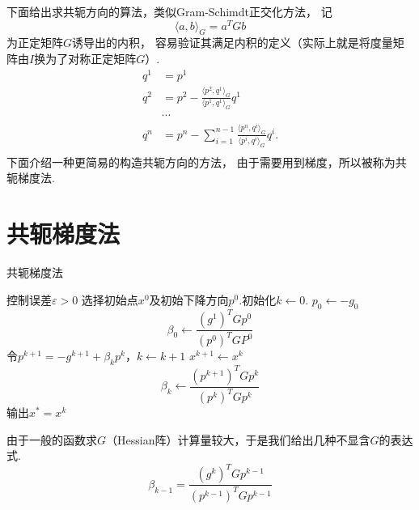 下面给出求共轭方向的算法，类似Gram-Schimdt正交化方法， 记
\begin{equation*}
	\langle a, b\rangle_G = a^T G b
\end{equation*}
为正定矩阵$G$诱导出的内积， 容易验证其满足内积的定义（实际上就是将度量矩阵由$I$换为了对称正定矩阵$G$）.
\begin{equation*}
	\begin{split}
		q^1 &= p^1\\
		q^2 &= p^2 - \frac{\langle p^2, q^1\rangle_G}{\langle p^1, q^1\rangle_G}q^1\\
		& \cdots \\
		q^n &= p^n -\sum \limits_{i=1}^{n-1}\frac{\langle p^n, q^i\rangle_G}{\langle p^i, q^i\rangle_G} q^i.\\
	\end{split}
\end{equation*}
下面介绍一种更简易的构造共轭方向的方法， 由于需要用到梯度，所以被称为共轭梯度法.
\section{共轭梯度法}
\begin{algorithm}[H]
\caption{共轭梯度法}%
\begin{algorithmic}[1]%
\Require 控制误差$\varepsilon > 0$
\State 选择初始点$x^0$及初始下降方向$p^0$.初始化$k \leftarrow 0$.
\State $p_0 \leftarrow -g_0$
\State 
\begin{equation*}
	\beta_0\leftarrow \frac{(g^1)^TGp^0}{(p^0)^TGP^0}
\end{equation*}
\State 令$p^{k+1} = -g^{k+1}+\beta_k p^k$，$k\leftarrow k+1$
\State $x^{k+1} \leftarrow x^k $
\State 
\begin{equation*}
	\beta_k \leftarrow \frac{(p^{k+1})^TGp^k}{(p^k)^TGp^k}
\end{equation*}
\EndWhile
\State 输出$x^* = x^k$
\end{algorithmic}  
\end{algorithm}

由于一般的函数求$G$（Hessian阵）计算量较大，于是我们给出几种不显含$G$的表达式.
\begin{equation*}
	\beta_{k-1} = \frac{(g^k)^TGp^{k-1}}{(p^{k-1})^TGp^{k-1}}
\end{equation*}
